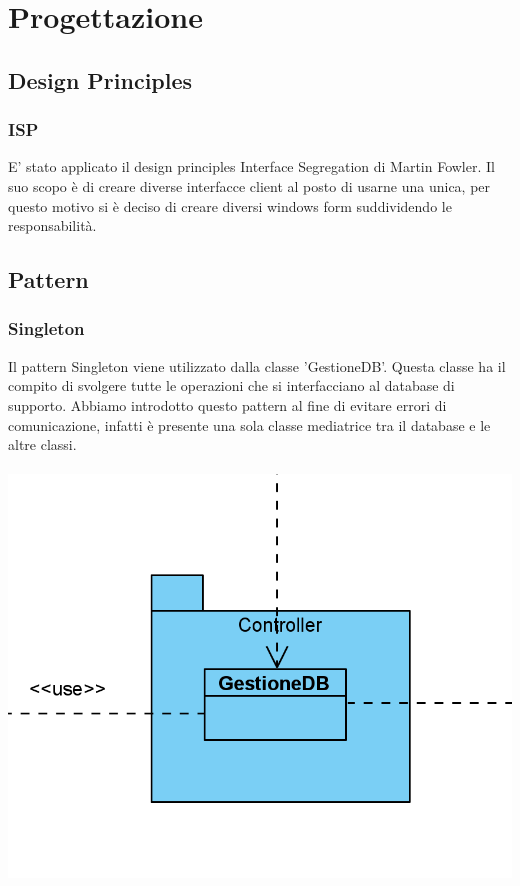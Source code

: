 \documentclass[a4paper, titlepage]{article}
\begin{document}
\section{Progettazione}
\subsection{Design Principles}
\subsubsection{ISP}
E' stato applicato il design principles Interface Segregation di Martin Fowler. Il suo scopo è di creare diverse interfacce client al posto di usarne una unica, per questo motivo si è deciso di creare diversi windows form suddividendo le responsabilità.
\subsection{Pattern}
\subsubsection{Singleton}
Il pattern Singleton viene utilizzato dalla classe 'GestioneDB'. Questa classe ha il compito di svolgere tutte le operazioni che si interfacciano al database di supporto. Abbiamo introdotto questo pattern al fine di evitare errori di comunicazione, infatti è presente una sola classe mediatrice tra il database e le altre classi.\\\\
\includegraphics[scale=0.80]{Immagini/Singleton.png}
\end{document}
